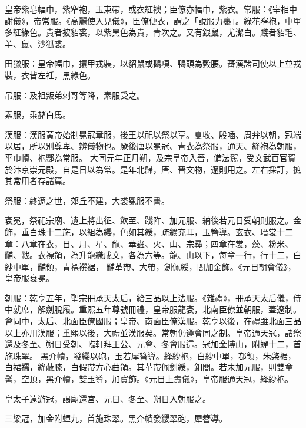 \begin{pinyinscope}
 皇帝紫皂幅巾，紫窄袍，玉束帶，或衣紅襖；臣僚亦幅巾，紫衣。常服：《宰相中謝儀》，帝常服。《高麗使入見儀》，臣僚便衣，謂之「說服力裹」。綠花窄袍，中單多紅綠色。貴者披貂裘，以紫黑色為貴，青次之。又有銀鼠，尤潔白。賤者貂毛、
 羊、鼠、沙狐裘。



 田獵服：皇帝幅巾，擐甲戎裝，以貂鼠或鵝項、鴨頭為瑴腰。蕃漢諸司使以上並戎裝，衣皆左衽，黑綠色。



 吊服：及祖叛弟剌哥等降，素服受之。



 素服，乘赭白馬。



 漢服：漢服黃帝始制冕冠章服，後王以祀以祭以享。夏收、殷喢、周弁以朝，冠端以居，所以別尊卑、辨儀物也。厥後唐以冕冠、青衣為祭服，通天、絳袍為朝服，平巾幘、袍酆為常服。
 大同元年正月朔，及宗皇帝入晉，備法駕，受文武百官賀於汴京崇元殿，自是日以為常。是年北歸，唐、晉文物，遼則用之。左右採訂，摭其常用者存諸篇。



 祭服：終遼之世，郊丘不建，大裘冕服不書。



 袞冕，祭祀宗廟、遺上將出征、飲至、踐阼、加元服、納後若元日受朝則服之。金飾，垂白珠十二旒，以組為纓，色如其綬，疏纊充耳，玉簪導。玄衣、瑨裳十二章：八章在衣，日、月、星、龍、華蟲、火、山、宗彞；四章在裳，藻、粉米、黼、黻。衣褾領，為升龍織成文，各為六等。龍、山以下，每章一行，行十二，白紗中單，黼領，青褾襈裾，
 黼革帶、大帶，劍佩綬，閤加金飾。《元日朝會儀》，皇帝服袞冕。



 朝服：乾亨五年，聖宗冊承天太后，給三品以上法服。《雜禮》，冊承天太后儀，侍中就席，解劍脫履。重熙五年尊號冊禮，皇帝服龍袞，北南臣僚並朝服，蓋遼制。會同中，太后、北面臣僚國服；皇帝、南面臣僚漢服。乾亨以後，在禮雖北面三品以上亦用漢服；重熙以後，大禮並漢服矣。常朝仍遵會同之制。皇帝通天冠，諸祭還及冬至、朔日受朝、臨軒拜王公、元會、冬會服這。冠加金博山，附蟬十二，首施珠翠。
 黑介幘，發纓以砲，玉若犀簪導。絳紗袍，白紗中單，鄀領，朱棨裾，白裙襦，絳蔽膝，白假帶方心曲領。其革帶佩劍綬，釦閤。若未加元服，則雙童髻，空頂，黑介幘，雙玉導，加寶飾。《元日上壽儀》，皇帝服通天冠，絳紗袍。



 皇太子遠游冠，謁廟還宮、元日、冬至、朔日入朝服之。



 三梁冠，加金附蟬九，首施珠翠。黑介幘發纓翠砲，犀簪導。




\end{pinyinscope}
